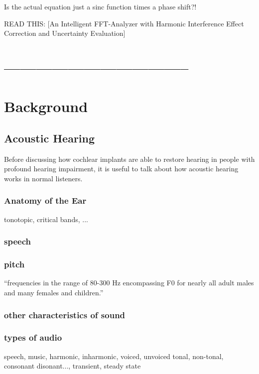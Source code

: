 \documentclass [11pt, proquest] {uwthesis}[2015/03/03]
\begin{document}
Is the actual equation just a sinc function times a phase shift?!

READ THIS: [An Intelligent FFT-Analyzer with Harmonic Interference Effect Correction and Uncertainty Evaluation]

\chapter{-----------------------------------}


\chapter{Background}

\section{Acoustic Hearing}

Before discussing how cochlear implants are able to restore hearing in people with profound hearing impairment, it is useful to talk about how acoustic hearing works in normal listeners.

\subsection{Anatomy of the Ear}

tonotopic, critical bands, ...

\subsection{speech}

\subsection{pitch}

``frequencies in the range of 80-300 Hz encompassing F0 for nearly all adult males and many females and children.''

\subsection{other characteristics of sound}

\subsection{types of audio}
speech, music, harmonic, inharmonic, voiced, unvoiced
tonal, non-tonal, consonant disonant..., transient, steady state
\end{document}
